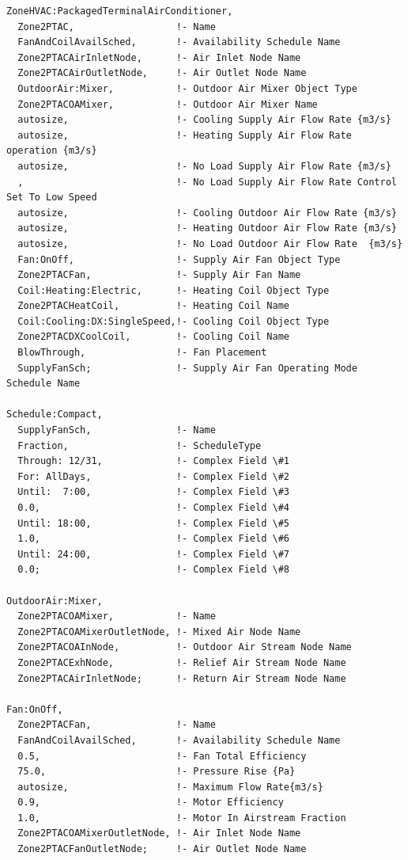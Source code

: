 \begin{lstlisting}
ZoneHVAC:PackagedTerminalAirConditioner,
  Zone2PTAC,                  !- Name
  FanAndCoilAvailSched,       !- Availability Schedule Name
  Zone2PTACAirInletNode,      !- Air Inlet Node Name
  Zone2PTACAirOutletNode,     !- Air Outlet Node Name
  OutdoorAir:Mixer,           !- Outdoor Air Mixer Object Type
  Zone2PTACOAMixer,           !- Outdoor Air Mixer Name
  autosize,                   !- Cooling Supply Air Flow Rate {m3/s}
  autosize,                   !- Heating Supply Air Flow Rate operation {m3/s}
  autosize,                   !- No Load Supply Air Flow Rate {m3/s}
  ,                           !- No Load Supply Air Flow Rate Control Set To Low Speed
  autosize,                   !- Cooling Outdoor Air Flow Rate {m3/s}
  autosize,                   !- Heating Outdoor Air Flow Rate {m3/s}
  autosize,                   !- No Load Outdoor Air Flow Rate  {m3/s}
  Fan:OnOff,                  !- Supply Air Fan Object Type
  Zone2PTACFan,               !- Supply Air Fan Name
  Coil:Heating:Electric,      !- Heating Coil Object Type
  Zone2PTACHeatCoil,          !- Heating Coil Name
  Coil:Cooling:DX:SingleSpeed,!- Cooling Coil Object Type
  Zone2PTACDXCoolCoil,        !- Cooling Coil Name
  BlowThrough,                !- Fan Placement
  SupplyFanSch;               !- Supply Air Fan Operating Mode Schedule Name

Schedule:Compact,
  SupplyFanSch,               !- Name
  Fraction,                   !- ScheduleType
  Through: 12/31,             !- Complex Field \#1
  For: AllDays,               !- Complex Field \#2
  Until:  7:00,               !- Complex Field \#3
  0.0,                        !- Complex Field \#4
  Until: 18:00,               !- Complex Field \#5
  1.0,                        !- Complex Field \#6
  Until: 24:00,               !- Complex Field \#7
  0.0;                        !- Complex Field \#8

OutdoorAir:Mixer,
  Zone2PTACOAMixer,           !- Name
  Zone2PTACOAMixerOutletNode, !- Mixed Air Node Name
  Zone2PTACOAInNode,          !- Outdoor Air Stream Node Name
  Zone2PTACExhNode,           !- Relief Air Stream Node Name
  Zone2PTACAirInletNode;      !- Return Air Stream Node Name

Fan:OnOff,
  Zone2PTACFan,               !- Name
  FanAndCoilAvailSched,       !- Availability Schedule Name
  0.5,                        !- Fan Total Efficiency
  75.0,                       !- Pressure Rise {Pa}
  autosize,                   !- Maximum Flow Rate{m3/s}
  0.9,                        !- Motor Efficiency
  1.0,                        !- Motor In Airstream Fraction
  Zone2PTACOAMixerOutletNode, !- Air Inlet Node Name
  Zone2PTACFanOutletNode;     !- Air Outlet Node Name


\end{lstlisting}
